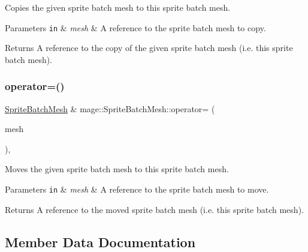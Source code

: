Copies the given sprite batch mesh to this sprite batch mesh.


\begin{DoxyParams}[1]{Parameters}
\mbox{\tt in}  & {\em mesh} & A reference to the sprite batch mesh to copy. \\
\hline
\end{DoxyParams}
\begin{DoxyReturn}{Returns}
A reference to the copy of the given sprite batch mesh (i.\+e. this sprite batch mesh). 
\end{DoxyReturn}
\hypertarget{classmage_1_1_sprite_batch_mesh_a2a9c60b7000d68649ac0eb5a08626795}{}\label{classmage_1_1_sprite_batch_mesh_a2a9c60b7000d68649ac0eb5a08626795} 
\subsubsection{\texorpdfstring{operator=()}{operator=()}\hspace{0.1cm}{\footnotesize\ttfamily [2/2]}}
{\footnotesize\ttfamily \hyperlink{classmage_1_1_sprite_batch_mesh}{Sprite\+Batch\+Mesh} \& mage\+::\+Sprite\+Batch\+Mesh\+::operator= (\begin{DoxyParamCaption}\item[{\hyperlink{classmage_1_1_sprite_batch_mesh}{Sprite\+Batch\+Mesh} \&\&}]{mesh }\end{DoxyParamCaption})\hspace{0.3cm}{\ttfamily [default]}, {\ttfamily [noexcept]}}

Moves the given sprite batch mesh to this sprite batch mesh.


\begin{DoxyParams}[1]{Parameters}
\mbox{\tt in}  & {\em mesh} & A reference to the sprite batch mesh to move. \\
\hline
\end{DoxyParams}
\begin{DoxyReturn}{Returns}
A reference to the moved sprite batch mesh (i.\+e. this sprite batch mesh). 
\end{DoxyReturn}


\subsection{Member Data Documentation}
\hypertarget{classmage_1_1_sprite_batch_mesh_a8d1e6e60f2f7ab36e559628e2cea600e}{}\label{classmage_1_1_sprite_batch_mesh_a8d1e6e60f2f7ab36e559628e2cea600e} 
